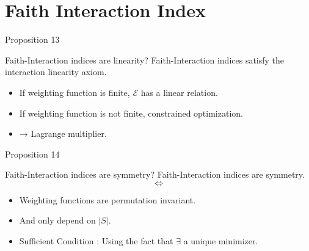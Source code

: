 \documentclass[10pt]{beamer}
\newcommand{\ex}{\Expl}
\def\Expl{\mathcal{E}}
\begin{document}

\section[Faith Interaction Index]{Faith Interaction Index}
\begin{frame}{Proposition 13}
    \begin{myaxiombox}{Faith-Interaction indices are linearity?}
         Faith-Interaction indices satisfy the interaction linearity axiom.
    \end{myaxiombox}
    \vspace{1.5em}
    \begin{itemize}[label=\scalebox{0.5}{$\blacksquare$}]
        \item If weighting function is finite, $\ex$ has a linear relation.
        \item If weighting function is not finite, constrained optimization.    \item → Lagrange multiplier.
    \end{itemize}
\end{frame}
\begin{frame}{Proposition 14}
    \begin{myaxiombox}{Faith-Interaction indices are symmetry?}
        Faith-Interaction indices are symmetry.
        \[\iff\]
        \begin{itemize}
            \item Weighting functions are permutation invariant.
            \item And only depend on $|S|$.
        \end{itemize}
    \end{myaxiombox}
    \begin{itemize}[label=\scalebox{0.5}{$\blacksquare$}]
        \item Sufficient Condition : Using the fact that $\exists$ a unique minimizer.
    \end{itemize}
\end{frame}
\end{document}
